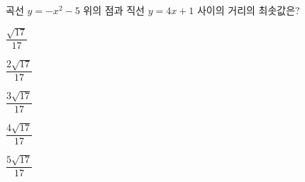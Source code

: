 곡선 $y=-x^2-5$ 위의 점과 직선 $y=4x+1$ 사이의 거리의 최솟값은?
\begin{choices32}{\rule[-3ex]{0pt}{8ex}$\dfrac{\sqrt{17}}{17}$}{\rule[-3ex]{0pt}{8ex}$\dfrac{2\sqrt{17}}{17}$}{\rule[-3ex]{0pt}{8ex}$\dfrac{3\sqrt{17}}{17}$}{\rule[-3ex]{0pt}{8ex}$\dfrac{4\sqrt{17}}{17}$}{\rule[-3ex]{0pt}{8ex}$\dfrac{5\sqrt{17}}{17}$}\end{choices32}

